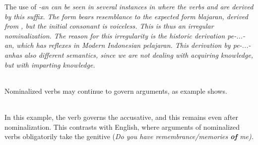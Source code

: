 The use of \em -an \em can be seen in several instances in  where the verbs  and  are derived by this suffix. The form  bears resemblance to the expected form \em *blajaran\em, derived from , but the initial consonant is voiceless. This is thus an irregular nominalization. The reason for this irregularity is the historic derivation \em pe-...-an\em, which has reflexes in Modern Indonesian \em pelajaran\em. This derivation by \em pe-...-an\em has also different semantics, since we are not dealing with acquiring knowledge, but with imparting knowledge.


 \\

Nominalized verbs may continue to govern arguments, as example  shows.

\\

In this example, the verb  governs the accusative, and this remains even after nominalization. This contrasts with English, where arguments of nominalized verbs obligatorily take the genitive  (\em Do you have remembrance/memories \textbf{of} me\em).

